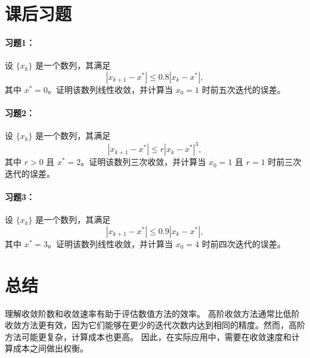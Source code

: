 \section*{课后习题}

\paragraph{习题1：}
设 $\{x_k\}$ 是一个数列，其满足
\[
|x_{k+1} - x^*| \leq 0.8 |x_k - x^*|,
\]
其中 $x^* = 0$。证明该数列线性收敛，并计算当 $x_0 = 1$ 时前五次迭代的误差。

\paragraph{习题2：}
设 $\{x_k\}$ 是一个数列，其满足
\[
|x_{k+1} - x^*| \leq r |x_k - x^*|^3,
\]
其中 $r > 0$ 且 $x^* = 2$。证明该数列三次收敛，并计算当 $x_0 = 1$ 且 $r = 1$ 时前三次迭代的误差。

\paragraph{习题3：}
设 $\{x_k\}$ 是一个数列，其满足
\[
|x_{k+1} - x^*| \leq 0.9 |x_k - x^*|,
\]
其中 $x^* = 3$。证明该数列线性收敛，并计算当 $x_0 = 4$ 时前四次迭代的误差。

\section*{总结}

理解收敛阶数和收敛速率有助于评估数值方法的效率。
高阶收敛方法通常比低阶收敛方法更有效，因为它们能够在更少的迭代次数内达到相同的精度。然而，高阶方法可能更复杂，计算成本也更高。
因此，在实际应用中，需要在收敛速度和计算成本之间做出权衡。





